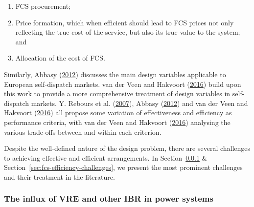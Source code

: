 \documentclass[12pt,a4paper,]{report}
\begin{document}
\begin{enumerate}
\def\labelenumi{\arabic{enumi}.}
\item
  FCS procurement;
\item
  Price formation, which when efficient should lead to FCS prices not
  only reflecting the true cost of the service, but also its true value
  to the system; and
\item
  Allocation of the cost of FCS.
\end{enumerate}

Similarly, Abbasy
(\protect\hyperlink{ref-abbasyNationalDesignMultinational2012}{2012})
discusses the main design variables applicable to European self-dispatch
markets. van der Veen and Hakvoort
(\protect\hyperlink{ref-vanderveenElectricityBalancingMarket2016}{2016})
build upon this work to provide a more comprehensive treatment of design
variables in self-dispatch markets. Y. Rebours et al.
(\protect\hyperlink{ref-reboursFundamentalDesignIssues2007}{2007}),
Abbasy
(\protect\hyperlink{ref-abbasyNationalDesignMultinational2012}{2012})
and van der Veen and Hakvoort
(\protect\hyperlink{ref-vanderveenElectricityBalancingMarket2016}{2016})
all propose some variation of effectiveness and efficiency as
performance criteria, with van der Veen and Hakvoort
(\protect\hyperlink{ref-vanderveenElectricityBalancingMarket2016}{2016})
analysing the various trade-offs between and within each criterion.

Despite the well-defined nature of the design problem, there are several
challenges to achieving effective and efficient arrangements. In
Section~\ref{sec:fcs-ibr-challenges} \&
Section~\ref{sec:fcs-efficiency-challenges}, we present the most
prominent challenges and their treatment in the literature.

\hypertarget{sec:fcs-ibr-challenges}{%
\subsubsection{The influx of VRE and other IBR in power
systems}\label{sec:fcs-ibr-challenges}}
\end{document}
